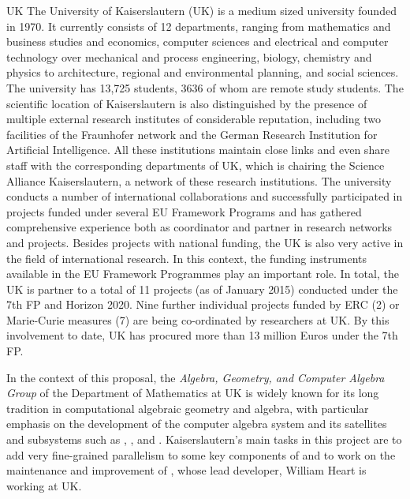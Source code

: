 \begin{sitedescription}{UK}
The University of Kaiserslautern (UK) is a medium sized university founded in 1970. It currently 
consists of 12 departments, ranging from mathematics and business studies and economics, 
computer sciences and electrical and computer technology over mechanical and process engineering, 
biology, chemistry and physics to architecture, regional and environmental planning, and social sciences. 
The university has 13,725 students, 3636 of whom are remote study students. The scientific location 
of Kaiserslautern is also distinguished by the presence of multiple external research institutes of 
considerable reputation, including two facilities of the Fraunhofer network and the German Research 
Institution for Artificial Intelligence. All these institutions maintain close links and even share staff 
with the corresponding departments of UK, which is chairing the Science Alliance Kaiserslautern, 
a network of these research institutions. The university conducts a number of international 
collaborations and successfully participated in projects funded under several EU Framework 
Programs and has gathered comprehensive experience both as coordinator and partner in research 
networks and projects. Besides projects with national funding, the UK is 
also very active in the field of international research. In this context, the funding instruments 
available in the EU Framework Programmes play an important role. In total, the UK is partner 
to a total of 11 projects (as of January 2015) conducted under the 7th FP and Horizon 2020. 
Nine further individual projects funded by ERC (2) or Marie-Curie measures (7) are being co-ordinated 
by researchers at UK. By this involvement to date, UK has procured more than 13 million Euros under the 7th FP.

\medskip In the context of this proposal, the
\emph{Algebra, Geometry, and Computer Algebra Group}  of the Department
of Mathematics at UK is widely known for its long tradition in 
computational algebraic geometry and algebra, with particular emphasis on the 
development of the computer algebra system \Singular and its satellites and  
subsystems such as , , and .
Kaiserslautern's main tasks in this project are to add very fine-grained 
parallelism to some key components of \Singular and to work
on the maintenance and improvement of \MPIR, whose lead developer,
William Heart is working at UK.


\end{sitedescription}
